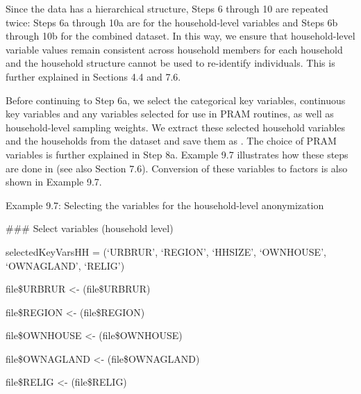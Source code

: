 \documentclass[letterpaper,10pt,english]{sphinxmanual}
\begin{document}
Since the data has a hierarchical structure, Steps 6 through 10 are
repeated twice: Steps 6a through 10a are for the household-level
variables and Steps 6b through 10b for the combined dataset. In this
way, we ensure that household-level variable values remain consistent
across household members for each household and the household structure
cannot be used to re-identify individuals. This is further explained in
Sections 4.4 and 7.6.

Before continuing to Step 6a, we select the categorical key variables,
continuous key variables and any variables selected for use in PRAM
routines, as well as household-level sampling weights. We extract these
selected household variables and the households from the dataset and
save them as . The choice of PRAM variables is further explained
in Step 8a. Example 9.7 illustrates how these steps are done in  (see
also Section 7.6).  Conversion of these variables to factors is also shown in
Example 9.7.

Example 9.7: Selecting the variables for the household-level
anonymization

\begin{DUlineblock}{0em}
\item[] \#\#\# Select variables (household level)
\item[] 
\item[] selectedKeyVarsHH = (‘URBRUR’, ‘REGION’, ‘HHSIZE’, ‘OWNHOUSE’,
‘OWNAGLAND’, ‘RELIG’)
\end{DUlineblock}


file\$URBRUR \textless{}- (file\$URBRUR)

file\$REGION \textless{}- (file\$REGION)

file\$OWNHOUSE \textless{}- (file\$OWNHOUSE)

file\$OWNAGLAND \textless{}- (file\$OWNAGLAND)

file\$RELIG \textless{}- (file\$RELIG)
\end{document}
